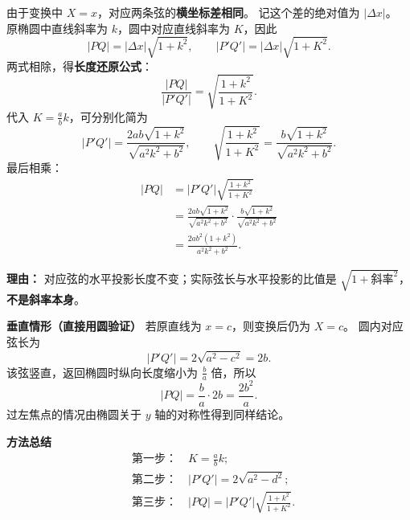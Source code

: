 \begin{proofbox}
\begin{description}[style=nextline, leftmargin=2.8em, labelsep=0.5em, itemsep=0.55em]
        \item[\textbf{步骤三（从圆弦长还原椭圆弦长）：}]
              由于变换中 $X=x$，对应两条弦的\textbf{横坐标差相同}。
              记这个差的绝对值为 $|\Delta x|$。
              原椭圆中直线斜率为 $k$，圆中对应直线斜率为 $K$，因此
              \[
                  |PQ|=|\Delta x|\sqrt{1+k^2},\qquad
                  |P'Q'|=|\Delta x|\sqrt{1+K^2}.
              \]
              两式相除，得\textbf{长度还原公式}：
              \[
                  \boxed{\frac{|PQ|}{|P'Q'|}
                    =\sqrt{\frac{1+k^2}{1+K^2}}}.
              \]
              代入 $K=\frac ab k$，可分别化简为
              \[
                  |P'Q'|
                  =\frac{2ab\sqrt{1+k^2}}{\sqrt{a^2k^2+b^2}},
                  \qquad
                  \sqrt{\frac{1+k^2}{1+K^2}}
                  =\frac{b\sqrt{1+k^2}}{\sqrt{a^2k^2+b^2}}.
              \]
              最后相乘：
              \[
                  \begin{aligned}
                      |PQ|
                       &=|P'Q'|\sqrt{\frac{1+k^2}{1+K^2}}\\[0.3em]
                       &=\frac{2ab\sqrt{1+k^2}}{\sqrt{a^2k^2+b^2}}
                         \cdot\frac{b\sqrt{1+k^2}}{\sqrt{a^2k^2+b^2}}\\[0.3em]
                       &=\boxed{\frac{2ab^2(1+k^2)}{a^2k^2+b^2}}.
                  \end{aligned}
              \]
              \par\textbf{理由：}
              对应弦的水平投影长度不变；实际弦长与水平投影的比值是
              $\sqrt{1+\text{斜率}^2}$，\textbf{不是斜率本身}。
    \end{description}

    \medskip

    \textbf{\textcolor{CProof}{垂直情形（直接用圆验证）}}
    若原直线为 $x=c$，则变换后仍为 $X=c$。
    圆内对应弦长为
    \[
        |P'Q'|=2\sqrt{a^2-c^2}=2b.
    \]
    该弦竖直，返回椭圆时纵向长度缩小为 $\frac ba$ 倍，所以
    \[
        \boxed{|PQ|=\frac ba\cdot 2b=\frac{2b^2}{a}}.
    \]
    过左焦点的情况由椭圆关于 $y$ 轴的对称性得到同样结论。

    \medskip

    \textbf{\textcolor{CProof}{方法总结}}
    \[
        \begin{aligned}
            &\text{第一步：}\quad K=\frac ab k;\\
            &\text{第二步：}\quad |P'Q'|=2\sqrt{a^2-d^2};\\
            &\text{第三步：}\quad |PQ|=|P'Q'|\sqrt{\frac{1+k^2}{1+K^2}}.
        \end{aligned}
    \]
\end{proofbox}


